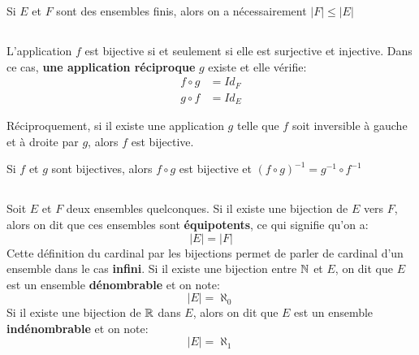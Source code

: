 Si \(E\) et \(F\) sont des ensembles finis, alors on a nécessairement \(|F| \leq |E|\)
\subsection*{}
L'application \(f\) est bijective si et seulement si elle est surjective et injective.\+  
Dans ce cas, \textbf{une application réciproque} \(g\) existe et elle vérifie:
\begin{align*}
   f \circ g &= Id_F \\
   g \circ f &= Id_E
\end{align*}

Réciproquement, si il existe une application \(g\) telle que \(f\) soit inversible à gauche et à droite par \(g\), alors \(f\) est bijective. \<

Si \(f\) et \(g\) sont bijectives, alors \(f \circ g\) est bijective et \((f \circ g)^{-1} = g^{-1} \circ f^{-1}\)

\subsection*{}
Soit \(E\) et \(F\) deux ensembles quelconques.\+
Si il existe une bijection de \(E\) vers \(F\), alors on dit que ces ensembles sont \textbf{équipotents}, ce qui signifie qu'on a:
\[
    |E| = |F|
\]
Cette définition du cardinal par les bijections permet de parler de cardinal d'un ensemble dans le cas \textbf{infini}.\+
Si il existe une bijection entre \(\mathbb{N}\) et \(E\), on dit que \(E\) est un ensemble \textbf{dénombrable} et on note:
\[
    |E| = \aleph_0
\]
Si il existe une bijection de \(\mathbb{R}\) dans \(E\), alors on dit que \(E\) est un ensemble \textbf{indénombrable} et on note:
\[
    |E| = \aleph_1
\]
